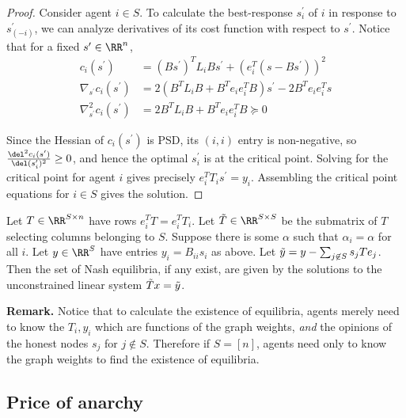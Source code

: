 \begin{proof}
Consider agent $i \in S$. To calculate the best-response $s_i^\prime$ of $i$ in response to $s_{(-i)}^{\prime}$, we can analyze derivatives of its cost function with respect to $s^\prime$. Notice that for a fixed $s^\prime \in \RR^n$, 
\begin{align*}
c_i(s^\prime) &= (Bs^\prime)^T L_i B s^\prime + (e_i^T (s - Bs^\prime))^2 \\
\nabla_{s^\prime} c_i(s^\prime) &= 2 (B^T L_i B + B^T e_i e_i^T B) s^\prime - 2 B^T e_i e_i^T  s
\\
\nabla_{s^\prime}^2 c_i(s^\prime) &= 2 B^T L_i B + B^T e_i e_i^T B \succeq 0 
\end{align*}


Since the Hessian of $c_i(s^\prime)$ is PSD, its $(i,i)$ entry is non-negative, so $\frac{\del^2 c_i(s^\prime)}{\del (s_i^\prime)^2} \geq 0$, and hence the optimal $s_i^\prime$ is at the critical point. Solving for the critical point for agent $i$ gives precisely $e_i^T T_i s^\prime = y_i$. Assembling the critical point equations for $i \in S$ gives the solution. 
\end{proof}

\begin{cor}
Let $T \in \RR^{S \times n}$ have rows $e_i^T T = e_i^T T_i$. Let $\Tilde T \in \RR^{S \times S}$ be the submatrix of $T$ selecting columns belonging to $S$. Suppose there is some $\alpha$ such that $\alpha_i = \alpha$ for all $i$. 
Let $y \in \RR^S$ have entries $y_i = B_{ii} s_i$ as above. Let $\Tilde y = y - \sum_{j \not \in S} s_j T e_j$. Then the set of Nash equilibria, if any exist, are given by the solutions to the unconstrained linear system $\Tilde Tx = \Tilde y$. 
\end{cor}


{\bf Remark.} Notice that to calculate the existence of equilibria, agents merely need to know the $T_i, y_i$ which are functions of the graph weights, {\em and} the opinions of the honest nodes $s_j$ for $j \not \in S$. Therefore if $S = [n]$, agents need only to know the graph weights to find the existence of equilibria. 

\subsection{Price of anarchy}

